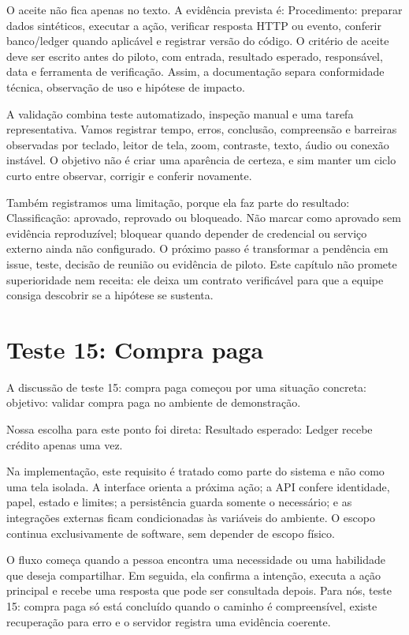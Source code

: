 \documentclass[12pt,oneside,a4paper,article]{abntex2}
\begin{document}
O aceite não fica apenas no texto. A evidência prevista é: Procedimento: preparar dados sintéticos, executar a ação, verificar resposta HTTP ou evento, conferir banco/ledger quando aplicável e registrar versão do código. O critério de aceite deve ser escrito antes do piloto, com entrada, resultado esperado, responsável, data e ferramenta de verificação. Assim, a documentação separa conformidade técnica, observação de uso e hipótese de impacto.

A validação combina teste automatizado, inspeção manual e uma tarefa representativa. Vamos registrar tempo, erros, conclusão, compreensão e barreiras observadas por teclado, leitor de tela, zoom, contraste, texto, áudio ou conexão instável. O objetivo não é criar uma aparência de certeza, e sim manter um ciclo curto entre observar, corrigir e conferir novamente.

Também registramos uma limitação, porque ela faz parte do resultado: Classificação: aprovado, reprovado ou bloqueado. Não marcar como aprovado sem evidência reproduzível; bloquear quando depender de credencial ou serviço externo ainda não configurado. O próximo passo é transformar a pendência em issue, teste, decisão de reunião ou evidência de piloto. Este capítulo não promete superioridade nem receita: ele deixa um contrato verificável para que a equipe consiga descobrir se a hipótese se sustenta.

\section{Teste 15: Compra paga}
A discussão de teste 15: compra paga começou por uma situação concreta: objetivo: validar compra paga no ambiente de demonstração.

Nossa escolha para este ponto foi direta: Resultado esperado: Ledger recebe crédito apenas uma vez.

Na implementação, este requisito é tratado como parte do sistema e não como uma tela isolada. A interface orienta a próxima ação; a API confere identidade, papel, estado e limites; a persistência guarda somente o necessário; e as integrações externas ficam condicionadas às variáveis do ambiente. O escopo continua exclusivamente de software, sem depender de escopo físico.

O fluxo começa quando a pessoa encontra uma necessidade ou uma habilidade que deseja compartilhar. Em seguida, ela confirma a intenção, executa a ação principal e recebe uma resposta que pode ser consultada depois. Para nós, teste 15: compra paga só está concluído quando o caminho é compreensível, existe recuperação para erro e o servidor registra uma evidência coerente.
\end{document}
